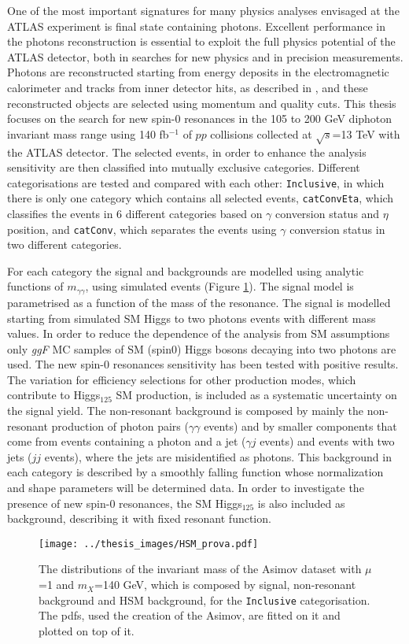 \documentclass[a4paper, oneside, 11pt]{book}
\begin{document}
	One of the most important signatures for many physics analyses envisaged at the ATLAS experiment is final state containing photons. Excellent performance in the photons reconstruction is essential to exploit the full physics potential of the ATLAS detector, both in searches for new physics and in precision measurements. Photons are reconstructed starting from energy deposits in the electromagnetic calorimeter and tracks from inner detector hits, as described in \cite{Aad_2019}, and these reconstructed objects are selected using momentum and quality cuts. This thesis focuses on the search for new spin-0 resonances in the 105 to 200 GeV diphoton invariant mass range using 140 fb$^{-1}$ of $pp$ collisions collected at $\sqrt{s}$=13 TeV with the ATLAS detector. The selected events, in order to enhance the analysis sensitivity are then classified into mutually exclusive categories. Different categorisations are tested and compared with each other: \texttt{Inclusive}, in which there is only one category which contains all selected events, \texttt{catConvEta}, which classifies the events in 6 different categories based on $\gamma$ conversion status and $\eta$ position, and \texttt{catConv}, which separates the events using $\gamma$ conversion status in two different categories.
	
	For each category the signal and backgrounds are modelled using analytic functions of $m_{\gamma\gamma}$, using simulated events (Figure \ref{fig:mass_inv}). The signal model is parametrised as a function of the mass of the resonance. The signal is modelled starting from simulated SM Higgs to two photons events with different mass values. In order to reduce the dependence of the analysis from SM assumptions only \textit{ggF} MC samples of SM (spin0) Higgs bosons decaying into two photons are used. The new spin-0 resonances sensitivity has been tested with positive results. The variation for efficiency selections for other production modes, which contribute to Higgs$_{125}$ SM production, is included as a systematic uncertainty on the signal yield. The non-resonant background is composed by mainly the non-resonant production of photon pairs ($\gamma\gamma$ events) and by smaller components that come from events containing a photon and a jet ($\gamma j$ events) and events with two jets ($jj$ events), where the jets are misidentified as photons. This background in each category is described by a smoothly falling function whose normalization and shape parameters will be determined data. In order to investigate the presence of new spin-0 resonances, the SM Higgs$_{125}$ is also included as background, describing it with fixed resonant function.
	\begin{figure}
		\centering
		\texttt{[image: ../thesis\_images/HSM\_prova.pdf]}
		\caption{The distributions of the invariant mass of the Asimov dataset with $\mu$=1 and $m_X$=140 GeV, which is composed by signal, non-resonant background and HSM background, for the \texttt{Inclusive} categorisation. The pdfs, used the creation of the Asimov, are fitted on it and plotted on top of it.}
		\label{fig:mass_inv}
	\end{figure}
	
\end{document}
